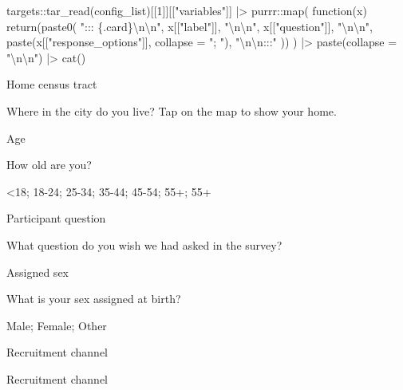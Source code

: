 \documentclass[
  letterpaper,
  DIV=11,
  numbers=noendperiod,
  oneside]{scrreprt}
\newenvironment{Shaded}{\begin{snugshade}}{\end{snugshade}}
\newcommand{\AttributeTok}[1]{\textcolor[rgb]{0.40,0.45,0.13}{#1}}
\newcommand{\ControlFlowTok}[1]{\textcolor[rgb]{0.00,0.23,0.31}{#1}}
\newcommand{\DecValTok}[1]{\textcolor[rgb]{0.68,0.00,0.00}{#1}}
\newcommand{\FunctionTok}[1]{\textcolor[rgb]{0.28,0.35,0.67}{#1}}
\newcommand{\NormalTok}[1]{\textcolor[rgb]{0.00,0.23,0.31}{#1}}
\newcommand{\SpecialCharTok}[1]{\textcolor[rgb]{0.37,0.37,0.37}{#1}}
\newcommand{\StringTok}[1]{\textcolor[rgb]{0.13,0.47,0.30}{#1}}
\begin{document}
\begin{Shaded}
\begin{Highlighting}[]
\NormalTok{targets}\SpecialCharTok{::}\FunctionTok{tar\_read}\NormalTok{(config\_list)[[}\DecValTok{1}\NormalTok{]][[}\StringTok{"variables"}\NormalTok{]] }\SpecialCharTok{|\textgreater{}}
\NormalTok{  purrr}\SpecialCharTok{::}\FunctionTok{map}\NormalTok{(}
    \ControlFlowTok{function}\NormalTok{(x) }\FunctionTok{return}\NormalTok{(}\FunctionTok{paste0}\NormalTok{(}
                              \StringTok{"::: \{.card\}}\SpecialCharTok{\textbackslash{}n\textbackslash{}n}\StringTok{"}\NormalTok{, }
\NormalTok{                              x[[}\StringTok{"label"}\NormalTok{]], }
                              \StringTok{"}\SpecialCharTok{\textbackslash{}n\textbackslash{}n}\StringTok{"}\NormalTok{,}
\NormalTok{                               x[[}\StringTok{"question"}\NormalTok{]],}
                              \StringTok{"}\SpecialCharTok{\textbackslash{}n\textbackslash{}n}\StringTok{"}\NormalTok{,}
                              \FunctionTok{paste}\NormalTok{(x[[}\StringTok{"response\_options"}\NormalTok{]], }\AttributeTok{collapse =} \StringTok{"; "}\NormalTok{),}
                              \StringTok{"}\SpecialCharTok{\textbackslash{}n\textbackslash{}n}\StringTok{:::"}
\NormalTok{                              ))}
\NormalTok{  ) }\SpecialCharTok{|\textgreater{}}
  \FunctionTok{paste}\NormalTok{(}\AttributeTok{collapse =} \StringTok{"}\SpecialCharTok{\textbackslash{}n\textbackslash{}n}\StringTok{"}\NormalTok{) }\SpecialCharTok{|\textgreater{}}
  \FunctionTok{cat}\NormalTok{()}
\end{Highlighting}
\end{Shaded}

Home census tract

Where in the city do you live? Tap on the map to show your home.

Age

How old are you?

\textless18; 18-24; 25-34; 35-44; 45-54; 55+; 55+

Participant question

What question do you wish we had asked in the survey?

Assigned sex

What is your sex assigned at birth?

Male; Female; Other

Recruitment channel

Recruitment channel
\end{document}
